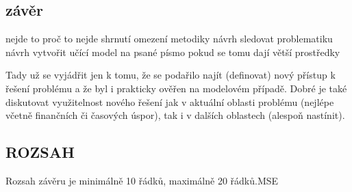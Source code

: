 \documentclass[journal]{IEEEtran}
\begin{document}
\subsection{závěr}
nejde to
proč to nejde
shrnutí omezení metodiky
návrh sledovat problematiku
návrh vytvořit učící model na psané písmo pokud se tomu dají větší prostředky

Tady už se vyjádřit jen k tomu, že se podařilo najít (definovat) nový přístup k řešení problému a že byl i prakticky ověřen na modelovém případě. 
Dobré je také diskutovat využitelnost nového řešení jak v aktuální oblasti problému (nejlépe včetně finančních či časových úspor), tak i v dalších oblastech (alespoň nastínit).
\subsection{ROZSAH}
Rozsah závěru je minimálně 10 řádků, maximálně 20 řádků.\ac{MSE}\cite{einstein}



\printbibliography

\printacronyms


\end{document}
